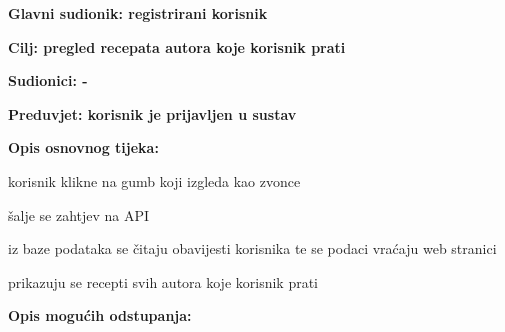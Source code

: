 					\noindent {}
					\begin{packed_item}
						\item \textbf{Glavni sudionik: registrirani korisnik}
						\item  \textbf{Cilj: pregled recepata autora koje korisnik prati}
						\item  \textbf{Sudionici: -}
						\item  \textbf{Preduvjet: korisnik je prijavljen u sustav}
						
						\item  \textbf{Opis osnovnog tijeka:}
						\item[] \begin{packed_enum}
							\item korisnik klikne na gumb koji izgleda kao zvonce
							\item šalje se zahtjev na API
							\item iz baze podataka se čitaju obavijesti korisnika te se podaci vraćaju web stranici
							\item prikazuju se recepti svih autora koje korisnik prati
						\end{packed_enum}
						
						\item  \textbf{Opis mogućih odstupanja:}
						\item[] \begin{packed_item}							
						\end{packed_item}
					\end{packed_item}
				
				
				
